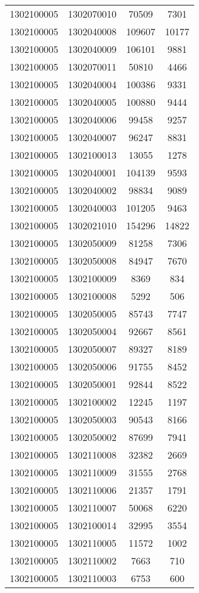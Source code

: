 \begin{longtable}{llcc}
1302100005 & 1302070010 & 70509 & 7301\\
1302100005 & 1302040008 & 109607 & 10177\\
1302100005 & 1302040009 & 106101 & 9881\\
1302100005 & 1302070011 & 50810 & 4466\\
1302100005 & 1302040004 & 100386 & 9331\\
1302100005 & 1302040005 & 100880 & 9444\\
1302100005 & 1302040006 & 99458 & 9257\\
1302100005 & 1302040007 & 96247 & 8831\\
1302100005 & 1302100013 & 13055 & 1278\\
1302100005 & 1302040001 & 104139 & 9593\\
1302100005 & 1302040002 & 98834 & 9089\\
1302100005 & 1302040003 & 101205 & 9463\\
1302100005 & 1302021010 & 154296 & 14822\\
1302100005 & 1302050009 & 81258 & 7306\\
1302100005 & 1302050008 & 84947 & 7670\\
1302100005 & 1302100009 & 8369 & 834\\
1302100005 & 1302100008 & 5292 & 506\\
1302100005 & 1302050005 & 85743 & 7747\\
1302100005 & 1302050004 & 92667 & 8561\\
1302100005 & 1302050007 & 89327 & 8189\\
1302100005 & 1302050006 & 91755 & 8452\\
1302100005 & 1302050001 & 92844 & 8522\\
1302100005 & 1302100002 & 12245 & 1197\\
1302100005 & 1302050003 & 90543 & 8166\\
1302100005 & 1302050002 & 87699 & 7941\\
1302100005 & 1302110008 & 32382 & 2669\\
1302100005 & 1302110009 & 31555 & 2768\\
1302100005 & 1302110006 & 21357 & 1791\\
1302100005 & 1302110007 & 50068 & 6220\\
1302100005 & 1302100014 & 32995 & 3554\\
1302100005 & 1302110005 & 11572 & 1002\\
1302100005 & 1302110002 & 7663 & 710\\
1302100005 & 1302110003 & 6753 & 600\\

\end{longtable}
